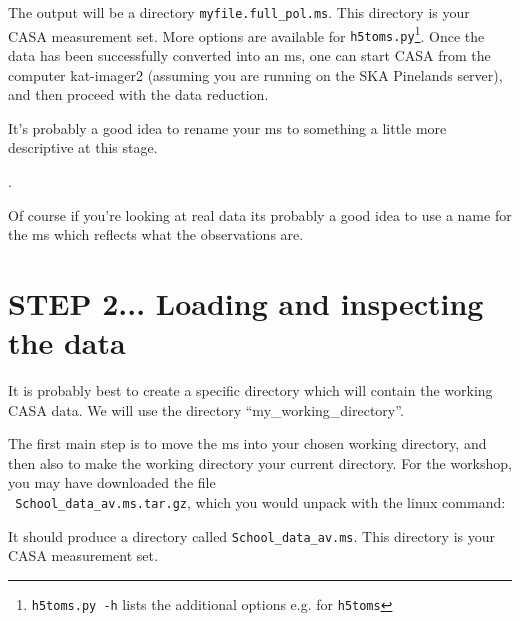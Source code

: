 \documentclass[force,almostfull,justified]{tufte-book}
\begin{document}
The output will be a directory {\tt myfile.full\_pol.ms}. This directory is your CASA measurement set.
More options are available for {\tt h5toms.py}\footnote{{\tt h5toms.py -h} lists the additional
options e.g.  for {\tt h5toms}}.  Once the data has been successfully converted into an ms, one can
start CASA from the computer kat-imager2 (assuming you are running on the SKA Pinelands server), and
then proceed with the data reduction.

It's probably a good idea to rename your ms to something a little more descriptive at this stage.

\bigskip
{}.

Of course if you're looking at real data its probably a good idea to use a name for the ms which
reflects what the observations are.

\bigskip
\section{STEP 2... Loading and inspecting the data}

It is probably best to create a specific directory which will contain the working CASA data.  We will
use the directory ``my\_working\_directory''.


\smallskip
The first main step is to move the ms into your chosen working directory, and then also to make the
working directory your current directory.  For the workshop, you may have downloaded the file \\ {\tt
School\_data\_av.ms.tar.gz}, which you would unpack with the linux command:

\smallskip
{}

\medskip
It should produce a directory called {\tt School\_data\_av.ms}.  This directory is your CASA
measurement set.

\smallskip
\bigskip
{}
\end{document}
